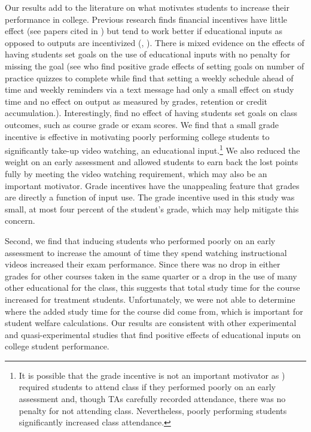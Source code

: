 \documentclass[12pt]{article}
\begin{document}
Our results add to the literature on what motivates students to increase their performance in college. Previous research finds financial incentives have little effect (see papers cited in \textcite{gmr2011}) but tend to work better if educational inputs as opposed to outputs are incentivized (\textcite{fryer2011}, \textcite{gmr2011}). There is mixed evidence on the effects of having students set goals on the use of educational inputs with no penalty for missing the goal (see \textcite{cgpr2020} who find positive grade effects of setting goals on number of practice quizzes to complete while \textcite{oppp2019} find that setting a weekly schedule ahead of time and weekly reminders via a text message had only a small effect on study time and no effect on output as measured by grades, retention or credit accumulation.). Interestingly, \textcite{cgpr2020} find no effect of having students set goals on class outcomes, such as course grade or exam scores. We find that a small grade incentive is effective in motivating poorly performing college students to significantly take-up video watching, an educational input.\footnote{It is possible that the grade incentive is not an important motivator as \textcite{dgm2010}) required students to attend class if they performed poorly on an early assessment and, though TAs carefully recorded attendance, there was no penalty for not attending class. Nevertheless, poorly performing students significantly increased class attendance.} We also reduced the weight on an early assessment and allowed students to earn back the lost points fully by meeting the video watching requirement, which may also be an important motivator. Grade incentives have the unappealing feature that grades are directly a function of input use. The grade incentive used in this study was small, at most four percent of the student's grade, which may help mitigate this concern.

Second, we find that inducing students who performed poorly on an early assessment to increase the amount of time they spend watching instructional videos increased their exam performance. Since there was no drop in either grades for other courses taken in the same quarter or a drop in the use of many other educational for the class, this suggests that total study time for the course increased for treatment students. Unfortunately, we were not able to determine where the added study time for the course did come from, which is important for student welfare calculations. Our results are consistent with other experimental and quasi-experimental studies that find positive effects of educational inputs on college student performance. %
\end{document}
